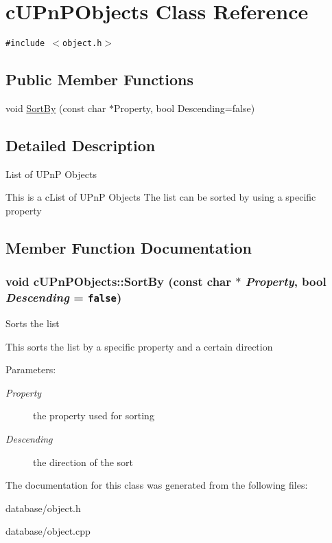 \hypertarget{classcUPnPObjects}{
\section{cUPnPObjects Class Reference}
\label{classcUPnPObjects}
}
{\tt \#include $<$object.h$>$}

\subsection*{Public Member Functions}
\begin{CompactItemize}
\item 
void \hyperlink{classcUPnPObjects_d9368864f90f5b72742895015df1aef2}{SortBy} (const char $\ast$Property, bool Descending=false)
\end{CompactItemize}


\subsection{Detailed Description}
List of UPnP Objects

This is a cList of UPnP Objects The list can be sorted by using a specific property 

\subsection{Member Function Documentation}
\hypertarget{classcUPnPObjects_d9368864f90f5b72742895015df1aef2}{
\subsubsection[{SortBy}]{\setlength{\rightskip}{0pt plus 5cm}void cUPnPObjects::SortBy (const char $\ast$ {\em Property}, \/  bool {\em Descending} = {\tt false})}}
\label{classcUPnPObjects_d9368864f90f5b72742895015df1aef2}


Sorts the list

This sorts the list by a specific property and a certain direction \begin{Desc}
\item[Parameters:]
\begin{description}
\item[{\em Property}]the property used for sorting \item[{\em Descending}]the direction of the sort \end{description}
\end{Desc}


The documentation for this class was generated from the following files:\begin{CompactItemize}
\item 
database/object.h\item 
database/object.cpp\end{CompactItemize}
